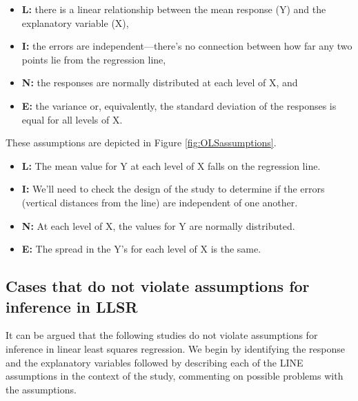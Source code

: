 \documentclass[
]{krantz}
\providecommand{\tightlist}{%
  \setlength{\itemsep}{0pt}\setlength{\parskip}{0pt}}
\begin{document}
\begin{itemize}
\tightlist
\item
  \textbf{L:} there is a linear relationship between the mean response (Y) and the explanatory variable (X),
\item
  \textbf{I:} the errors are independent---there's no connection between how far any two points lie from the regression line,
\item
  \textbf{N:} the responses are normally distributed at each level of X, and
\item
  \textbf{E:} the variance or, equivalently, the standard deviation of the responses is equal for all levels of X.
\end{itemize}

These assumptions are depicted in Figure \ref{fig:OLSassumptions}.

\begin{itemize}
\tightlist
\item
  \textbf{L:} The mean value for Y at each level of X falls on the regression line.
\item
  \textbf{I:} We'll need to check the design of the study to determine if the errors (vertical distances from the line) are independent of one another.
\item
  \textbf{N:} At each level of X, the values for Y are normally distributed.
\item
  \textbf{E:} The spread in the Y's for each level of X is the same.
\end{itemize}

\hypertarget{cases-that-do-not-violate-assumptions-for-inference-in-llsr}{%
\subsection{Cases that do not violate assumptions for inference in LLSR}\label{cases-that-do-not-violate-assumptions-for-inference-in-llsr}}

It can be argued that the following studies do not violate assumptions for inference in linear least squares regression. We begin by identifying the response and the explanatory variables followed by describing each of the LINE assumptions in the context of the study, commenting on possible problems with the assumptions.
\end{document}
